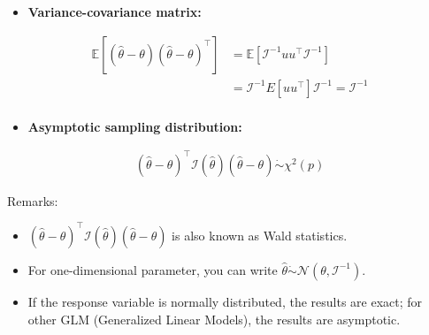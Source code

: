 \documentclass[11pt]{article}
\begin{document}
\begin{itemize}
    \item \textbf{Variance-covariance matrix:}
\end{itemize}

\begin{align}
    \mathbb{E}[(\hat{\theta} - \theta)(\hat{\theta} - \theta)^\top] &= \mathbb{E}[\mathcal{I}^{-1}uu^\top \mathcal{I}^{-1}] \nonumber \\
    &= \mathcal{I}^{-1}E[uu^\top] \mathcal{I}^{-1} = \mathcal{I}^{-1} \nonumber \\
\end{align}

\begin{itemize}
    \item \textbf{Asymptotic sampling distribution:}
\end{itemize}

\begin{align}
    (\hat{\theta} - \theta)^\top \mathcal{I}(\hat{\theta})(\hat{\theta} - \theta) \dot\sim \chi^2(p) \nonumber
\end{align}

Remarks:
\begin{itemize}
    \item \((\hat{\theta} - \theta)^\top \mathcal{I}(\hat{\theta})(\hat{\theta} - \theta)\) is also known as Wald statistics.
    \item For one-dimensional parameter, you can write \(\hat{\theta} \dot\sim \mathcal{N}(\theta, \mathcal{I}^{-1})\).
    \item If the response variable is normally distributed, the results are exact; for other GLM (Generalized Linear Models), the results are asymptotic.
\end{itemize}
\end{document}
